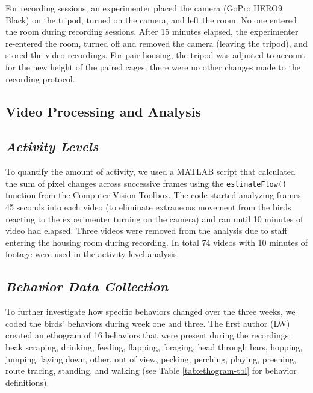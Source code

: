 \documentclass[
  pub]{apa6}
\begin{document}
For recording sessions, an experimenter placed the camera (GoPro HERO9 Black) on the tripod, turned on the camera, and left the room. No one entered the room during recording sessions. After 15 minutes elapsed, the experimenter re-entered the room, turned off and removed the camera (leaving the tripod), and stored the video recordings. For pair housing, the tripod was adjusted to account for the new height of the paired cages; there were no other changes made to the recording protocol.

\hypertarget{video-processing-and-analysis}{%
\subsection{Video Processing and Analysis}\label{video-processing-and-analysis}}

\hypertarget{activity-levels}{%
\subsection{\texorpdfstring{\emph{Activity Levels}}{Activity Levels}}\label{activity-levels}}

To quantify the amount of activity, we used a MATLAB script that calculated the sum of pixel changes across successive frames using the \texttt{estimateFlow()} function from the Computer Vision Toolbox. The code started analyzing frames 45 seconds into each video (to eliminate extraneous movement from the birds reacting to the experimenter turning on the camera) and ran until 10 minutes of video had elapsed. Three videos were removed from the analysis due to staff entering the housing room during recording. In total 74 videos with 10 minutes of footage were used in the activity level analysis.

\hypertarget{behavior-data-collection}{%
\subsection{\texorpdfstring{\emph{Behavior Data Collection}}{Behavior Data Collection}}\label{behavior-data-collection}}

To further investigate how specific behaviors changed over the three weeks, we coded the birds' behaviors during week one and three. The first author (LW) created an ethogram of 16 behaviors that were present during the recordings: beak scraping, drinking, feeding, flapping, foraging, head through bars, hopping, jumping, laying down, other, out of view, pecking, perching, playing, preening, route tracing, standing, and walking (see Table \ref{tab:ethogram-tbl} for behavior definitions).
\end{document}
